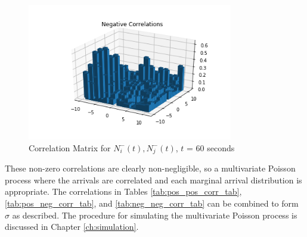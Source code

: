\begin{figure}[t]
\begin{center}
\caption{Correlation Matrix for $N^{-}_i(t), N^{-}_j(t)$, $t$ = 60 seconds}
\label{fig:neg_neg_corr_pic}
\includegraphics[width=0.8\textwidth]{LaTeX/Figures/neg_neg_correlations.png}
\end{center}
\end{figure}

These non-zero correlations are clearly non-negligible, so a multivariate Poisson process where the arrivals are correlated and each marginal arrival distribution is appropriate. The correlations in Tables \ref{tab:pos_pos_corr_tab}, \ref{tab:pos_neg_corr_tab}, and \ref{tab:neg_neg_corr_tab} can be combined to form $\sigma$ as described. The procedure for simulating the multivariate Poisson process is discussed in Chapter \ref{ch:simulation}.

